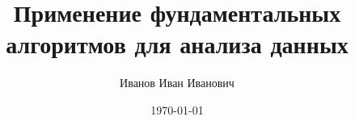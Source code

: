 \documentclass[a4paper,12pt]{article}
\author{Иванов Иван Иванович}
\title{Применение фундаментальных алгоритмов для анализа данных}
\date{\today}
\begin{document}
\maketitle

\tableofcontents

\clearpage



\printbibliography

\clearpage

\printglossaries

\clearpage
\end{document}
